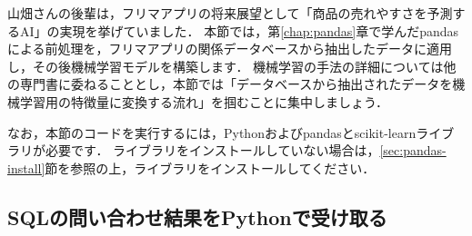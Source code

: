 山畑さんの後輩は，フリマアプリの将来展望として「商品の売れやすさを予測するAI」の実現を挙げていました．
本節では，第\ref{chap:pandas}章で学んだpandasによる前処理を，フリマアプリの関係データベースから抽出したデータに適用し，その後機械学習モデルを構築します．
機械学習の手法の詳細については他の専門書に委ねることとし，本節では「データベースから抽出されたデータを機械学習用の特徴量に変換する流れ」を掴むことに集中しましょう．

なお，本節のコードを実行するには，Pythonおよびpandasとscikit-learnライブラリが必要です．
ライブラリをインストールしていない場合は，\ref{sec:pandas-install}節を参照の上，ライブラリをインストールしてください．




\subsection{SQLの問い合わせ結果をPythonで受け取る}


